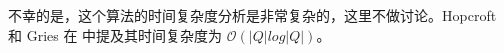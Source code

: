 不幸的是，这个算法的时间复杂度分析是非常复杂的，这里不做讨论。Hopcroft 和 Gries 在 \cite{Grie73,Hopc71} 中提及其时间复杂度为 $ \mathcal{O}(|Q|log|Q|) $。


